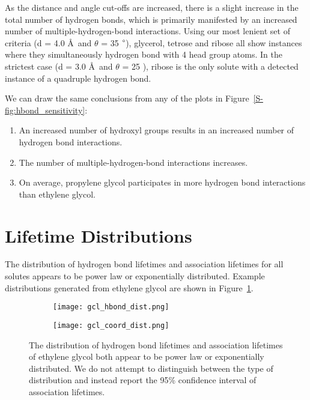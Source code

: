   As the distance and angle cut-offs are increased, there is a slight increase in the total
  number of hydrogen bonds, which is primarily manifested by an increased number of multiple-hydrogen-bond
  interactions. Using our most lenient set of criteria (d = 4.0 \AA~and $\theta$ = 35 $\degree$), glycerol,
  tetrose and ribose all show instances where they simultaneously hydrogen bond with 4 head group atoms.
  In the strictest case (d = 3.0 \AA~and $\theta$ = 25 \degree), ribose is the only solute with a 
  detected instance of a quadruple hydrogen bond.
  
  We can draw the same conclusions from any of the plots in Figure~\ref{S-fig:hbond_sensitivity}:
  \begin{enumerate}
    \item An increased number of hydroxyl groups results in an increased number of hydrogen bond
    interactions.
    \item The number of multiple-hydrogen-bond interactions increases.
    \item On average, propylene glycol participates in more hydrogen bond interactions than 
    ethylene glycol.  %
  \end{enumerate}
  
  \section{Lifetime Distributions}\label{S-section:lifetime_distributions}
  
  The distribution of hydrogen bond lifetimes and association lifetimes
  for all solutes appears to be power law or exponentially distributed. 
  Example distributions generated from ethylene glycol are shown in
  Figure~\ref{S-fig:lifetime_distributions}. 
  
  \begin{figure}[!htb]
  \centering
  \begin{subfigure}{0.45\textwidth}
  \texttt{[image: gcl\_hbond\_dist.png]}
  \caption{}
  \end{subfigure}
  \begin{subfigure}{0.45\textwidth}
  \texttt{[image: gcl\_coord\_dist.png]}
  \caption{}
  \end{subfigure}
  \caption{The distribution of hydrogen bond lifetimes and association lifetimes of
  ethylene glycol both appear to be power law or exponentially distributed. We
  do not attempt to distinguish between the type of distribution and instead report
  the 95\% confidence interval of association lifetimes.}\label{S-fig:lifetime_distributions}
  \end{figure}  
  
